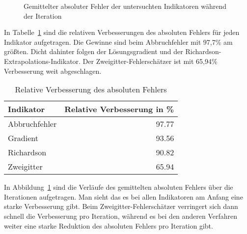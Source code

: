 \begin{figure}[h]
\centering
{}
\caption{Gemittelter absoluter Fehler der untersuchten Indikatoren während der Iteration}
\label{fig:it_all}
\end{figure}
\noindent
In Tabelle~\ref{tab:verb} sind die relativen Verbesserungen des absoluten Fehlers für jeden
Indikator aufgetragen. Die Gewinne sind beim Abbruchfehler mit 97,7\% am größten.
Dicht dahinter folgen der Lösungsgradient und der Richardson-Extrapolations-Indikator.
Der Zweigitter-Fehlerschätzer ist mit 65,94\% Verbesserung weit abgeschlagen.

\begin{table}[h]
  \begin{tabular}{l r}
  \toprule
  Indikator & Relative Verbesserung in \% \\
  \midrule
      Abbruchfehler & 97.77\\
      Gradient & 93.56\\
      Richardson & 90.82\\
      Zweigitter & 65.94\\
  \bottomrule
\end{tabular}
\caption{Relative Verbesserung des absoluten Fehlers}
\label{tab:verb}
\end{table}
\vspace{2cm}
\noindent
In Abbildung~\ref{fig:it_all} sind die Verläufe des gemittelten absoluten
Fehlers über die Iterationen aufgetragen. Man sieht das es bei allen Indikatoren
am Anfang eine starke Verbesserung gibt. Beim Zweigitter-Fehlerschätzer
verringert sich dann schnell die Verbesserung pro Iteration, während es bei den anderen
Verfahren weiter eine starke Reduktion des absoluten Fehlers pro Iteration gibt.
